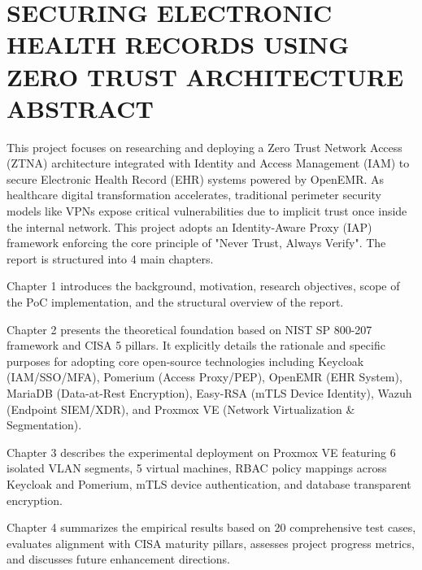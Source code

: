 \section*{\fontsize{16pt}{15pt}\selectfont SECURING ELECTRONIC HEALTH RECORDS USING ZERO TRUST ARCHITECTURE \\ABSTRACT}

This project focuses on researching and deploying a Zero Trust Network Access (ZTNA) architecture integrated with Identity and Access Management (IAM) to secure Electronic Health Record (EHR) systems powered by OpenEMR. As healthcare digital transformation accelerates, traditional perimeter security models like VPNs expose critical vulnerabilities due to implicit trust once inside the internal network. This project adopts an Identity-Aware Proxy (IAP) framework enforcing the core principle of "Never Trust, Always Verify". The report is structured into 4 main chapters.

Chapter 1 introduces the background, motivation, research objectives, scope of the PoC implementation, and the structural overview of the report.

Chapter 2 presents the theoretical foundation based on NIST SP 800-207 framework and CISA 5 pillars. It explicitly details the rationale and specific purposes for adopting core open-source technologies including Keycloak (IAM/SSO/MFA), Pomerium (Access Proxy/PEP), OpenEMR (EHR System), MariaDB (Data-at-Rest Encryption), Easy-RSA (mTLS Device Identity), Wazuh (Endpoint SIEM/XDR), and Proxmox VE (Network Virtualization \& Segmentation).

Chapter 3 describes the experimental deployment on Proxmox VE featuring 6 isolated VLAN segments, 5 virtual machines, RBAC policy mappings across Keycloak and Pomerium, mTLS device authentication, and database transparent encryption.

Chapter 4 summarizes the empirical results based on 20 comprehensive test cases, evaluates alignment with CISA maturity pillars, assesses project progress metrics, and discusses future enhancement directions.

\newpage

